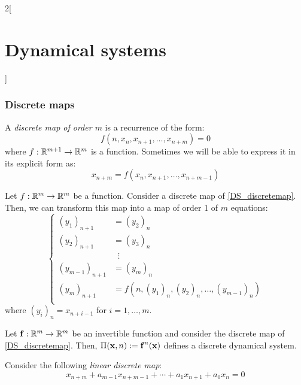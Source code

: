\documentclass[../../../main_math.tex]{subfiles}
\begin{document}
\begin{multicols}{2}[\section{Dynamical systems}]
  \subsubsection{Discrete maps}
  \begin{definition}
    A \emph{discrete map of order $m$} is a recurrence of the form:
    \begin{equation}
      f(n,x_n,x_{n+1},\ldots,x_{n+m})=0
    \end{equation}
    where $f:\mathbb{R}^{m+1}\rightarrow\mathbb{R}^m$ is a function. Sometimes we will be able to express it in its explicit form as:
    \begin{equation}\label{DS_discretemap}
      x_{n+m}=f(x_n,x_{n+1},\ldots,x_{n+m-1})
    \end{equation}
  \end{definition}
  \begin{proposition}
    Let $f:\mathbb{R}^{m}\rightarrow\mathbb{R}^m$ be a function. Consider a discrete map of \cref{DS_discretemap}. Then, we can transform this map into a map of order 1 of $m$ equations:
    \begin{equation*}
      \left\{
      \begin{aligned}
        {(y_1)}_{n+1}     & ={(y_2)}_{n}                                   \\
        {(y_2)}_{n+1}     & ={(y_3)}_{n}                                   \\
                          & \;\;\vdots                                     \\
        {(y_{m-1})}_{n+1} & ={(y_m)}_{n}                                   \\
        {(y_m)}_{n+1}     & =f(n,{(y_1)}_n,{(y_2)}_n,\ldots,{(y_{m-1})}_n) \\
      \end{aligned}
      \right.
    \end{equation*}
    where ${(y_i)}_n=x_{n+i-1}$ for $i=1,\ldots,m$.
  \end{proposition}
  \begin{proposition}
    Let $\boldsymbol{\mathrm{f}}:\mathbb{R}^m\rightarrow\mathbb{R}^m$ be an invertible function and consider the discrete map of \cref{DS_discretemap}. Then, $\Pi(\boldsymbol{\mathrm{x}},n):=\boldsymbol{\mathrm{f}}^n(\boldsymbol{\mathrm{x}})$ defines a discrete dynamical system.
  \end{proposition}
  \begin{proposition}
    Consider the following \emph{linear discrete map}:
    \begin{equation*}
      x_{n+m}+a_{m-1}x_{n+m-1} + \cdots + a_1 x_{n+1} + a_0 x_n = 0

\end{equation*}
\end{proposition}
\end{multicols}
\end{document}
